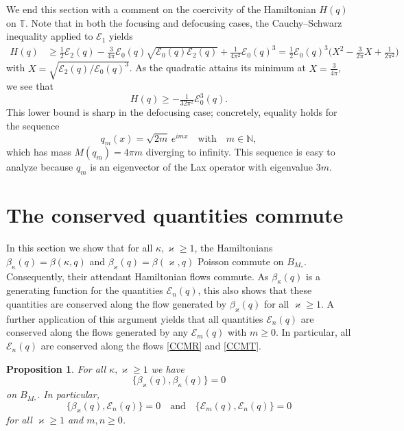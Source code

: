 \documentclass{amsart}
\numberwithin{equation}{section}
\newtheorem{proposition}[theorem]{Proposition}
\theoremstyle{definition}
\newcommand{\ka}{\kappa}
\newcommand{\vk}{\varkappa}
\newcommand{\N}{\mathbb{N}}
\newcommand{\T}{\mathbb{T}}
\newcommand{\E}{\mathcal{E}}
\newcommand{\qtq}[1]{\quad\text{#1}\quad}
\begin{document}
We end this section with a comment on the coercivity of the Hamiltonian $H(q)$ on $\T$. Note that in both the focusing and defocusing cases, the Cauchy--Schwarz inequality applied to $\E_1$ yields
\begin{align*}
H(q)&\geq \tfrac{1}{2}\E_2(q)-\tfrac{3}{4\pi}\E_0(q)\sqrt{\E_0(q)\E_2(q)}+\tfrac{1}{4\pi^2}\E_0(q)^3= \tfrac{1}{2}\E_0(q)^3\bigl(X^2-\tfrac3{2\pi}X+\tfrac1{2\pi^2}\bigr)
\end{align*}
with $X=\sqrt{\E_2(q)/\E_0(q)^3}$. As the quadratic attains its minimum at $X=\frac3{4\pi}$, we see that
$$H(q)\geq-\tfrac1{32\pi^2}\E_0^3(q).$$
This lower bound is sharp in the defocusing case; concretely, equality holds for the sequence
$$
q_m(x) = \sqrt{2m}\, e^{imx} \qtq{with} m\in \N ,
$$
which has mass $M(q_m)=4\pi m$ diverging to infinity.   This sequence is easy to analyze because $q_m$ is an eigenvector of the Lax operator with eigenvalue $3m$.



\section{The conserved quantities commute}\label{sec:commute}
In this section we show that for all $\ka, \vk\geq 1$, the Hamiltonians $\beta_\ka(q) =\beta(\ka,q)$ and $\beta_\vk(q)=\beta(\vk, q)$ Poisson commute on $B_{M_*}$.  Consequently, their attendant Hamiltonian flows commute.  As $\beta_\ka(q)$ is a generating function for the quantities $\mathcal{E}_n(q)$, this also shows that these quantities are conserved along the flow generated by $\beta_\vk(q)$ for all $\vk\geq 1$.  A further application of this argument yields that all quantities $\mathcal{E}_n(q)$ are conserved along the flows generated by any $\mathcal{E}_m(q)$ with $m\geq 0$.  In particular, all $\mathcal{E}_n(q)$ are conserved along the flows \eqref{CCMR} and \eqref{CCMT}.

\begin{proposition}\label{P:beta comm}
For all $\ka, \vk\geq 1$ we have
$$
\{\beta_\vk(q),\beta_\ka(q)\}=0
$$
on $B_{M_*}$. In particular, 
$$
\{\beta_\vk(q),\mathcal E_n(q)\}=0 \qtq{and} \{\mathcal E_m(q),\mathcal E_n(q)\}=0
$$
for all $\vk\geq 1$ and $m,n\geq 0$.
\end{proposition}
\end{document}
